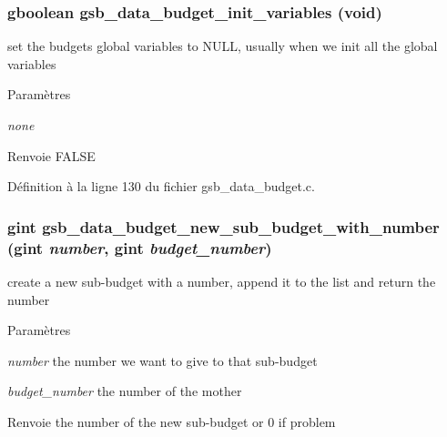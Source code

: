 \subsubsection[{gsb\_\-data\_\-budget\_\-init\_\-variables}]{\setlength{\rightskip}{0pt plus 5cm}gboolean gsb\_\-data\_\-budget\_\-init\_\-variables (void)}\label{gsb__data__budget_8c_ac0fa7f6b2e330b65a497ec9a17f757ba}
set the budgets global variables to NULL, usually when we init all the global variables


\begin{DoxyParams}{Paramètres}
\item[{\em none}]\end{DoxyParams}
\begin{DoxyReturn}{Renvoie}
FALSE 
\end{DoxyReturn}


Définition à la ligne 130 du fichier gsb\_\-data\_\-budget.c.

\subsubsection[{gsb\_\-data\_\-budget\_\-new\_\-sub\_\-budget\_\-with\_\-number}]{\setlength{\rightskip}{0pt plus 5cm}gint gsb\_\-data\_\-budget\_\-new\_\-sub\_\-budget\_\-with\_\-number (gint {\em number}, \/  gint {\em budget\_\-number})}\label{gsb__data__budget_8c_a6320ffd3c5561de179640c85404dc87d}
create a new sub-\/budget with a number, append it to the list and return the number


\begin{DoxyParams}{Paramètres}
\item[{\em number}]the number we want to give to that sub-\/budget \item[{\em budget\_\-number}]the number of the mother\end{DoxyParams}
\begin{DoxyReturn}{Renvoie}
the number of the new sub-\/budget or 0 if problem 
\end{DoxyReturn}


